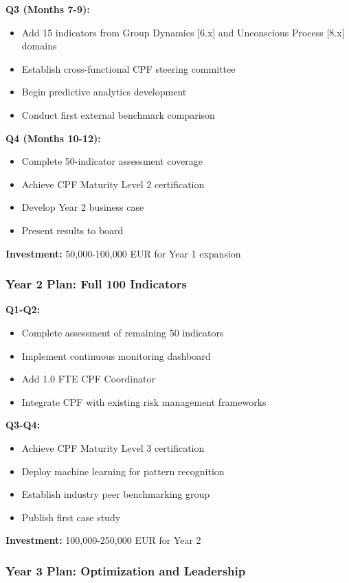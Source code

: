 \documentclass[11pt,a4paper]{article}
\begin{document}
\textbf{Q3 (Months 7-9):}
\begin{itemize}
\item Add 15 indicators from Group Dynamics [6.x] and Unconscious Process [8.x] domains
\item Establish cross-functional CPF steering committee
\item Begin predictive analytics development
\item Conduct first external benchmark comparison
\end{itemize}

\textbf{Q4 (Months 10-12):}
\begin{itemize}
\item Complete 50-indicator assessment coverage
\item Achieve CPF Maturity Level 2 certification
\item Develop Year 2 business case
\item Present results to board
\end{itemize}

\textbf{Investment:} 50,000-100,000 EUR for Year 1 expansion

\subsubsection{Year 2 Plan: Full 100 Indicators}

\textbf{Q1-Q2:}
\begin{itemize}
\item Complete assessment of remaining 50 indicators
\item Implement continuous monitoring dashboard
\item Add 1.0 FTE CPF Coordinator
\item Integrate CPF with existing risk management frameworks
\end{itemize}

\textbf{Q3-Q4:}
\begin{itemize}
\item Achieve CPF Maturity Level 3 certification
\item Deploy machine learning for pattern recognition
\item Establish industry peer benchmarking group
\item Publish first case study
\end{itemize}

\textbf{Investment:} 100,000-250,000 EUR for Year 2

\subsubsection{Year 3 Plan: Optimization and Leadership}
\end{document}
